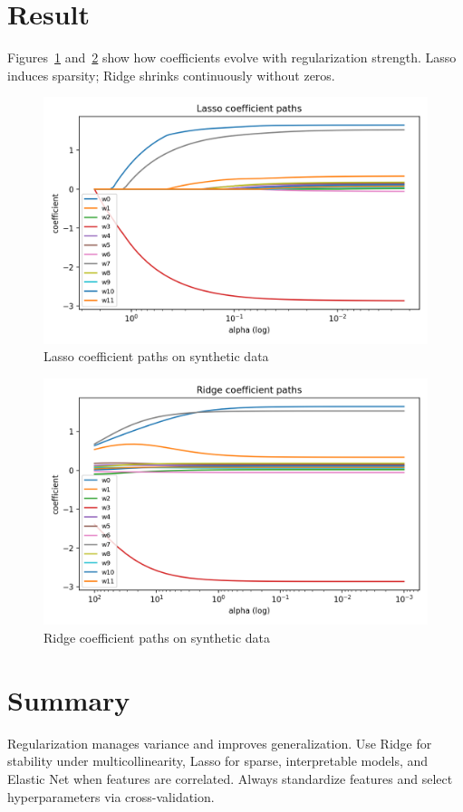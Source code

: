 \documentclass{article}
\begin{document}
\section{Result}
Figures~\ref{fig:lasso_path} and~\ref{fig:ridge_path} show how coefficients evolve with regularization strength. Lasso induces sparsity; Ridge shrinks continuously without zeros.

\begin{figure}[H]
  \centering
  \includegraphics[width=0.85\linewidth]{lasso_path.png}
  \caption{Lasso coefficient paths on synthetic data}
  \label{fig:lasso_path}
\end{figure}

\begin{figure}[H]
  \centering
  \includegraphics[width=0.85\linewidth]{ridge_path.png}
  \caption{Ridge coefficient paths on synthetic data}
  \label{fig:ridge_path}
\end{figure}

\FloatBarrier

\section{Summary}
Regularization manages variance and improves generalization. Use Ridge for stability under multicollinearity, Lasso for sparse, interpretable models, and Elastic Net when features are correlated. Always standardize features and select hyperparameters via cross-validation.
\end{document}
